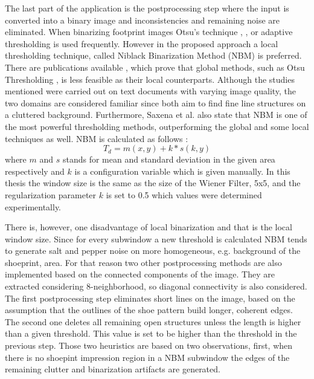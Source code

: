 \documentclass[draft,final]{vutinfth} %
\begin{document}
\par
The last part of the application is the postprocessing step where the input is converted into a binary image and inconsistencies and remaining noise are eliminated.
When binarizing footprint images Otsu's technique \cite{algarni2008novel}, \cite{alizadeh2017automatic}, \cite{wu2019crime} or adaptive thresholding \cite{wang2014automatic} is used frequently.
However in the proposed approach a local thresholding technique, called Niblack Binarization Method (NBM) \cite{niblack1985introduction} is preferred.
There are publications available \cite{som2011application}, which prove that global methods, such as Otsu Thresholding \cite{otsu1979threshold}, is less feasible as their local counterparts.
Although the studies mentioned were carried out on text documents with varying image quality, the two domains are considered familiar since both aim to find fine line structures on a cluttered background.
Furthermore, Saxena et al. \cite{saxena2019niblack} also state that NBM is one of the most powerful thresholding methods, outperforming the global and some local techniques as well. 
NBM  is calculated as follows \cite{saxena2019niblack}:
\begin{equation}
T_d = m(x,y) + k * s(k, y)
\end{equation}
where $m$ and $s$ stands for mean and standard deviation in the given area respectively and $k$ is a configuration variable which is given manually. 
In this thesis the window size is the same as the size of the Wiener Filter, 5x5, and the regularization parameter $k$ is set to 0.5 which values were determined experimentally.
\par
There is, however, one disadvantage of local binarization and that is the  local window size.
Since for every subwindow a new threshold is calculated NBM tends to generate salt and pepper noise on more homogeneous, e.g. background of the shoeprint, area.
For that reason two other postprocessing methods are also implemented based on the connected components of the image.
They are extracted considering 8-neighborhood, so diagonal connectivity is also considered.
The first postprocessing step eliminates short lines on the image, based on the assumption that the outlines of the shoe pattern build longer, coherent edges.
The second one deletes all remaining open structures unless the length is higher than a given threshold.
This value is set to be higher than the threshold in the previous step.
Those two heuristics are based on two observations, first,  when there is no shoepint impression region in a NBM subwindow the edges of the remaining clutter and binarization artifacts are generated.
\end{document}
